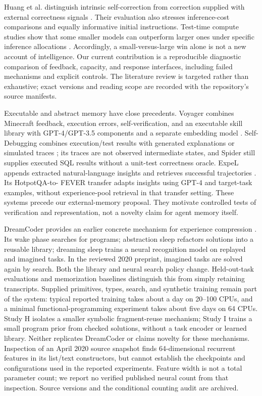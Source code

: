 \documentclass[11pt]{article}
\begin{document}
Huang et al. distinguish intrinsic self-correction from correction supplied
with external correctness signals \cite{huang}. Their evaluation also stresses
inference-cost comparisons and equally informative initial instructions.
Test-time compute studies show that some smaller models can outperform larger
ones under specific inference allocations \cite{snell}. Accordingly, a
small-versus-large win alone is not a new account of intelligence. Our current
contribution is a reproducible diagnostic comparison of feedback, capacity,
and response interfaces, including failed mechanisms and explicit controls.
The literature review is targeted rather than exhaustive; exact versions and
reading scope are recorded with the repository's source manifests.


Executable and abstract memory have close precedents. Voyager combines
Minecraft feedback, execution errors, self-verification, and an executable
skill library with GPT-4/GPT-3.5 components and a separate embedding model
\cite{voyager}. Self-Debugging combines execution/test results with generated
explanations or simulated traces \cite{selfdebug}; its traces are not observed
intermediate states, and Spider still supplies executed SQL results without
a unit-test correctness oracle. ExpeL appends extracted natural-language
insights and retrieves successful trajectories \cite{expel}. Its HotpotQA-to-
FEVER transfer adapts insights using GPT-4 and target-task examples, without
experience-pool retrieval in that transfer setting. These systems precede
our external-memory proposal. They motivate controlled tests of verification
and representation, not a novelty claim for agent memory itself.

DreamCoder provides an earlier concrete mechanism for experience compression
\cite{dreamcoder}. Its wake phase searches for programs; abstraction sleep
refactors solutions into a reusable library; dreaming sleep trains a neural
recognition model on replayed and imagined tasks. In the reviewed 2020
preprint, imagined tasks are solved again by search. Both the library and
neural search policy change. Held-out-task evaluations and memorization
baselines distinguish this from simply retaining transcripts. Supplied
primitives, types, search, and synthetic training remain part of the system:
typical reported training takes about a day on 20--100 CPUs, and a minimal
functional-programming experiment takes about five days on 64 CPUs. Study H
isolates a smaller symbolic fragment-reuse mechanism; Study I trains a small
program prior from checked solutions, without a task encoder or learned
library. Neither replicates DreamCoder or claims novelty for these mechanisms.
Inspection of an April 2020 source snapshot finds 64-dimensional recurrent
features in its list/text constructors, but cannot establish the checkpoints
and configurations used in the reported experiments. Feature width is not a
total parameter count; we report no verified published neural count from that
inspection. Source versions and the conditional counting audit are archived.
\end{document}
